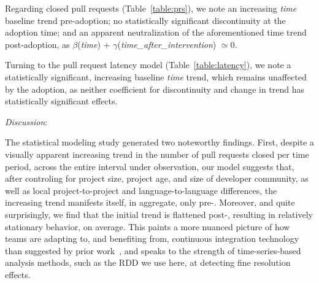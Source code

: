 Regarding closed pull requests (Table~\ref{table:prs}), we note an increasing
\emph{time} baseline trend pre-adoption; no statistically significant discontinuity
at the adoption time; and an apparent neutralization of the aforementioned time
trend post-adoption, as $\beta$(\emph{time}) $+$ 
$\gamma$(\emph{time\_after\_intervention}) $\simeq 0$.

Turning to the pull request latency model (Table~\ref{table:latency}), we note
a statistically significant, increasing baseline \emph{time} trend, which remains
unaffected by the \Tvis adoption, as neither coefficient for discontinuity and
change in trend has statistically significant effects.



\smallskip\noindent \emph{Discussion}:

The statistical modeling study generated two noteworthy findings.
First, despite a visually apparent increasing trend in the number of pull requests 
closed per time period, across the entire interval under observation, our model 
suggests that, after controling for project size, project age, and size of developer 
community, as well as local project-to-project and language-to-language differences, 
the increasing trend manifests itself, in aggregate, only pre-\Tvi.
Moreover, and quite surprisingly, we find that the initial trend is flattened post-\Tvi,
resulting in relatively stationary behavior, on average.
This paints a more nuanced picture of how \GH teams are adapting to, and
benefiting from, continuous integration technology than suggested by prior
work~\cite{VasilescuYWDF15}, and speaks to the strength of time-series-based
analysis methods, such as the RDD we use here, at detecting fine resolution effects.

